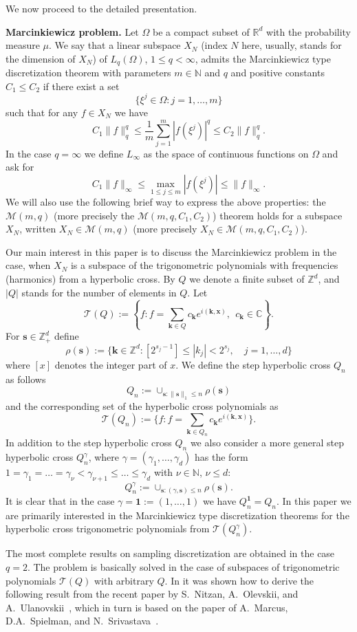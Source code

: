 \documentclass[12pt]{article}
\newcommand{\N}{{\mathbb{N}}}
\def \Tr{\mathcal T}
\def \cM{\mathcal M}
\def\R{{\mathbb R}}
\def\Z{\mathbb Z}
\def\ga{\gamma}
\def\bx{\mathbf x}
\def\bk{\mathbf k}
\def\bs{\mathbf s}
\numberwithin{equation}{section}
\newcommand{\be}{\begin{equation}}
\newcommand{\ee}{\end{equation}}
\begin{document}
We now proceed to the detailed presentation.

{\bf Marcinkiewicz problem.} Let $\Omega$ be a compact subset of $\R^d$ with the probability measure $\mu$. We say that a linear subspace $X_N$ (index $N$ here, usually, stands for the dimension of $X_N$) of $L_q(\Omega)$, $1\le q < \infty$, admits the Marcinkiewicz type discretization theorem with parameters $m\in \N$ and $q$ and positive constants $C_1\le C_2$ if there exist a set 
$$
\Big\{\xi^j \in \Omega: j=1,\dots,m\Big\}
$$ 
 such that for any $f\in X_N$ we have
\be\label{I.1}
C_1\|f\|_q^q \le \frac{1}{m} \sum_{j=1}^m |f(\xi^j)|^q \le C_2\|f\|_q^q.
\ee
In the case $q=\infty$ we define $L_\infty$ as the space of continuous functions on $\Omega$  and ask for
\be\label{I.2}
C_1\|f\|_\infty \le \max_{1\le j\le m} |f(\xi^j)| \le  \|f\|_\infty.
\ee
We will also use the following brief way to express the above properties: the $\cM(m,q)$ (more precisely the $\cM(m,q,C_1,C_2)$) theorem holds for  a subspace $X_N$, written $X_N \in \cM(m,q)$ (more precisely $X_N \in \cM(m,q,C_1,C_2)$).

Our main interest in this paper is to discuss the Marcinkiewicz problem in the case, when 
$X_N$ is a subspace of the trigonometric polynomials with frequencies (harmonics) from
a hyperbolic cross. 
By $Q$ we denote a finite subset of $\Z^d$, and $|Q|$ stands for the number of elements in $Q$. Let
$$
\Tr(Q):= \left\{f: f=\sum_{\bk\in Q}c_\bk e^{i(\bk,\bx)},\  \  c_{\bk}\in\mathbb{C}\right\}.
$$
For $\bs\in\Z^d_+$
define
$$
\rho (\bs) := \{\bk \in \Z^d : [2^{s_j-1}] \le |k_j| < 2^{s_j}, \quad j=1,\dots,d\}
$$
where $[x]$ denotes the integer part of $x$. We define the step hyperbolic cross
$Q_n$ as follows
$$
Q_n := \cup_{\bs:\|\bs\|_1\le n} \rho(\bs)
$$
and the corresponding set of the hyperbolic cross polynomials as 
$$
\Tr(Q_n) := \{f: f=\sum_{\bk\in Q_n} c_\bk e^{i(\bk,\bx)}\}.
$$
In addition to the step hyperbolic cross $Q_n$ we also consider a more general step hyperbolic 
cross $Q_n^\ga$, where $\ga = (\ga_1,\dots,\ga_d)$ has the form $1=\ga_1=\dots=\ga_\nu< \ga_{\nu+1} \le \dots\le \ga_d$ with $\nu\in \N$, $\nu \le d$:
$$
Q_n^\ga := \cup_{\bs:(\ga,\bs)\le n} \rho(\bs).
$$
It is clear that in the case $\ga = {\mathbf 1} := (1,\dots,1)$ we have $Q_n^{\mathbf 1} = Q_n$.
In this paper we are primarily interested in the Marcinkiewicz type discretization theorems for the hyperbolic cross trigonometric polynomials from $\Tr(Q_n^\ga)$.

The most complete results on sampling discretization are obtained in the case $q=2$.  The problem is basically solved in the case of subspaces of trigonometric polynomials $\Tr(Q)$ with arbitrary $Q$.
In \cite{VT158} it was shown how to derive the following result from the
 recent paper by  S.~Nitzan, A.~Olevskii, and A.~Ulanovskii~\cite{NOU}, which in turn is based on the paper of A.~Marcus, D.A.~Spielman, and N.~Srivastava~\cite{MSS}.
\end{document}
